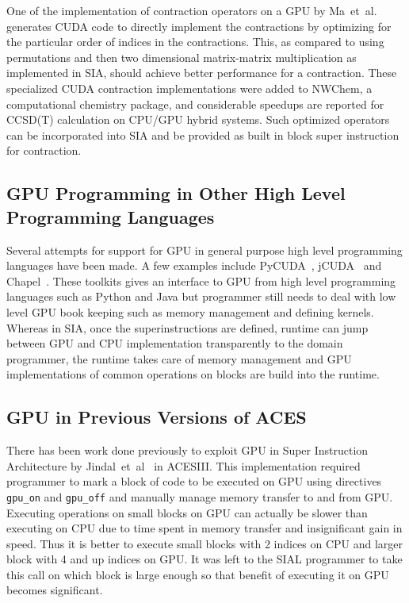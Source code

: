 One of the implementation of contraction operators on a GPU by
Ma~et~al.~\cite{Ma2013} generates CUDA code to directly implement the contractions
by optimizing for the particular order of indices in the contractions. This, as
compared to using permutations and then two dimensional matrix-matrix multiplication
as implemented in SIA, should achieve better performance for a contraction. These
specialized CUDA contraction implementations were added to NWChem, a computational
chemistry package, and considerable speedups are reported for CCSD(T) calculation
on CPU/GPU hybrid systems. Such optimized operators can be incorporated into SIA
and be provided as built in block super instruction for contraction.

\subsection{GPU Programming in Other High Level Programming Languages}
Several attempts for support for GPU in general purpose high level programming
languages have been made. A few examples include PyCUDA~\cite{pycuda2011},
jCUDA~\cite{jcuda2009} and Chapel~\cite{chapelgpu}. These toolkits gives an interface
to GPU from high level programming languages such as Python and Java but
programmer still needs to deal with low level GPU book keeping such as memory
management and defining kernels. Whereas in SIA, once the superinstructions are
defined, runtime can jump between GPU and CPU implementation transparently to
the domain programmer, the runtime takes care of memory management and GPU
implementations of common operations on blocks are build into the runtime.

\subsection{GPU in Previous Versions of ACES}
There has been work done previously to exploit GPU in Super Instruction
Architecture by Jindal~et~al~\cite{Jindal2016} in ACESIII. This implementation
required programmer to mark a block of code to be executed on GPU using
directives \texttt{gpu\_on} and \texttt{gpu\_off} and manually manage memory
transfer to and from GPU. Executing operations on small blocks on GPU can
actually be slower than executing on CPU due to time spent in memory transfer and
insignificant gain in speed. Thus it is better to execute small blocks with 2
indices on CPU and larger block with 4 and up indices on GPU. It was left to the
SIAL programmer to take this call on which block is large enough so that benefit
of executing it on GPU becomes significant.


